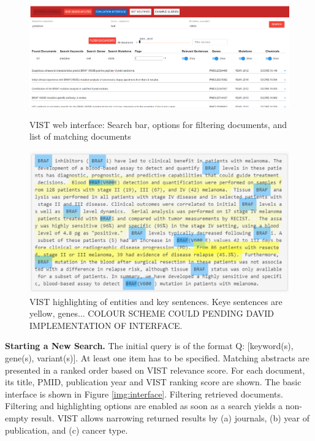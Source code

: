 \documentclass[fleqn,10pt]{wlscirep}
\begin{document}
\begin{figure}[htbp]
\centering
\begin{minipage}[b]{0.45\linewidth}
	\includegraphics[width=\linewidth]{img/interface/searchResults.png}
	\caption{VIST web interface: Search bar, options for filtering documents, and list of matching documents}
	\label{img:interface}
\end{minipage}
\hspace{0.5cm}
\begin{minipage}[b]{0.45\linewidth}
	\includegraphics[width=\linewidth]{img/interface/highlightedText.png}
	\caption{VIST highlighting of entities and key sentences. Keye sentences are yellow, genes... COLOUR SCHEME COULD PENDING DAVID IMPLEMENTATION OF INTERFACE.}
	\label{img:highlightedText}
\end{minipage}
\end{figure}


\textbf{Starting a New Search.}
The initial query is of the format Q: [keyword(s), gene(s), variant(s)]. At least one item has to be specified. Matching abstracts are presented in a ranked order based on VIST relevance score. For each document, its title, PMID, publication year and VIST ranking score are shown. The basic interface is shown in Figure \ref{img:interface}. Filtering retrieved documents. Filtering and highlighting options are enabled as soon as a search yields a non-empty result. VIST allows narrowing returned results by (a) journals, (b) year of publication, and (c) cancer type. 
\end{document}
